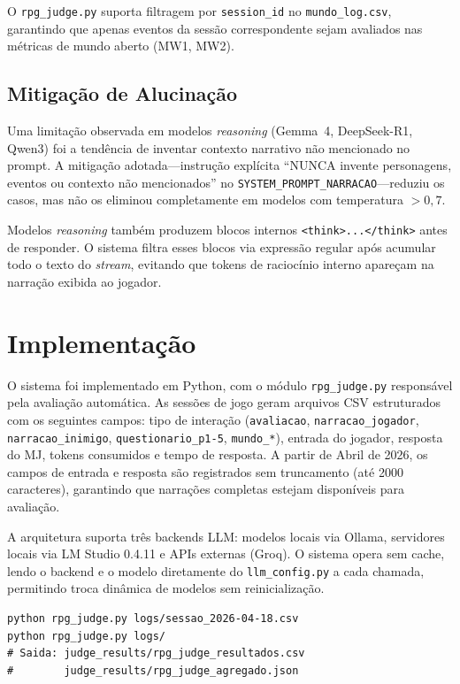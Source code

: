 \documentclass[12pt]{article}
\begin{document}
O \texttt{rpg\_judge.py} suporta filtragem por \texttt{session\_id} no \texttt{mundo\_log.csv}, garantindo que apenas eventos da sessão correspondente sejam avaliados nas métricas de mundo aberto (MW1, MW2).

\subsection{Mitigação de Alucinação}

Uma limitação observada em modelos \textit{reasoning} (Gemma~4, DeepSeek-R1, Qwen3) foi a tendência de inventar contexto narrativo não mencionado no prompt. A mitigação adotada---instrução explícita ``NUNCA invente personagens, eventos ou contexto não mencionados'' no \texttt{SYSTEM\_PROMPT\_NARRACAO}---reduziu os casos, mas não os eliminou completamente em modelos com temperatura $> 0{,}7$.

Modelos \textit{reasoning} também produzem blocos internos \texttt{<think>...</think>} antes de responder. O sistema filtra esses blocos via expressão regular após acumular todo o texto do \textit{stream}, evitando que tokens de raciocínio interno apareçam na narração exibida ao jogador.

\section{Implementação}

O sistema foi implementado em Python, com o módulo \texttt{rpg\_judge.py} responsável pela avaliação automática. As sessões de jogo geram arquivos CSV estruturados com os seguintes campos: tipo de interação (\texttt{avaliacao}, \texttt{narracao\_jogador}, \texttt{narracao\_inimigo}, \texttt{questionario\_p1-5}, \texttt{mundo\_*}), entrada do jogador, resposta do MJ, tokens consumidos e tempo de resposta. A partir de Abril de 2026, os campos de entrada e resposta são registrados sem truncamento (até 2000 caracteres), garantindo que narrações completas estejam disponíveis para avaliação.

A arquitetura suporta três backends LLM: modelos locais via Ollama, servidores locais via LM Studio 0.4.11 e APIs externas (Groq). O sistema opera sem cache, lendo o backend e o modelo diretamente do \texttt{llm\_config.py} a cada chamada, permitindo troca dinâmica de modelos sem reinicialização.

\begin{footnotesize}
\begin{verbatim}
python rpg_judge.py logs/sessao_2026-04-18.csv
python rpg_judge.py logs/
# Saida: judge_results/rpg_judge_resultados.csv
#        judge_results/rpg_judge_agregado.json
\end{verbatim}
\end{footnotesize}
\end{document}
